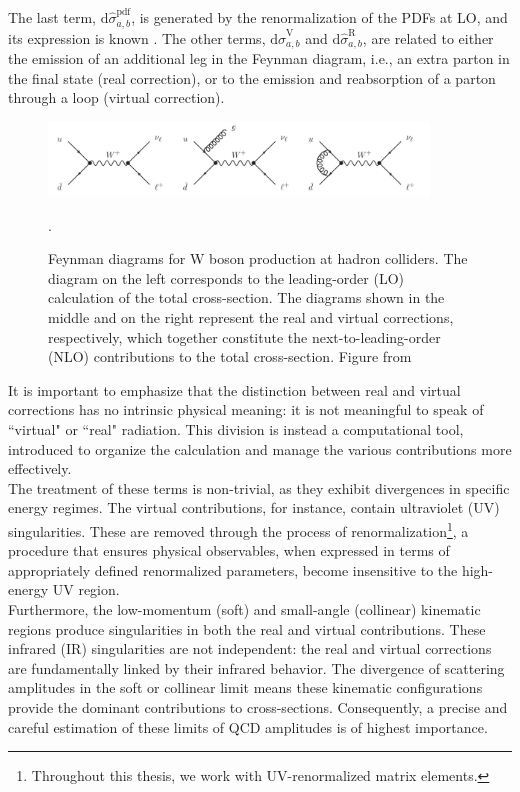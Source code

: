 \documentclass[a4paper, 12pt]{book}
\begin{document}
The last term, $\mathrm{d} \hat{\sigma}_{a,b}^{\mathrm{pdf}}$, is generated by the renormalization of the PDFs at LO, and its expression is known \cite{Catani:1996vz}. The other terms, $\mathrm{d} \hat{\sigma}_{a,b}^{\mathrm{V}}$ and $\mathrm{d} \hat{\sigma}_{a,b}^{\mathrm{R}}$, are related to either the emission of an additional leg in the Feynman diagram, i.e., an extra parton in the final state (real correction), or to the emission and reabsorption of a parton through a loop (virtual correction).  \par\bigskip
\begin{figure}[!ht]
	\centering
	\includegraphics[width=0.9\textwidth]{imgs/real-and-virtual.png}
	\caption{Feynman diagrams for W boson production at hadron colliders. The diagram on the left corresponds to the leading-order (LO) calculation of the total cross-section. The diagrams shown in the middle and on the right represent the real and virtual corrections, respectively, which together constitute the next-to-leading-order (NLO) contributions to the total cross-section. Figure from \cite{Campbell:2017}}.
	\label{hadron-collision}
\end{figure}
It is important to emphasize that the distinction between real and virtual corrections has no intrinsic physical meaning: it is not meaningful to speak of ``virtual" or ``real" radiation. This division is instead a computational tool, introduced to organize the calculation and manage the various contributions more effectively. \\ The treatment of these terms is non-trivial, as they exhibit divergences in specific energy regimes. The virtual contributions, for instance, contain ultraviolet (UV) singularities. These are removed through the process of renormalization\footnote{Throughout this thesis, we work with UV-renormalized matrix elements.}, a procedure that ensures physical observables, when expressed in terms of appropriately defined renormalized parameters, become insensitive to the high-energy UV region. \\ Furthermore, the low-momentum (soft) and small-angle (collinear) kinematic regions produce singularities in both the real and virtual contributions. These infrared (IR) singularities are not independent: the real and virtual corrections are fundamentally linked by their infrared behavior. The divergence of scattering amplitudes in the soft or collinear limit means these kinematic configurations provide the dominant contributions to cross-sections. Consequently, a precise and careful estimation of these limits of QCD amplitudes is of highest importance.
\end{document}
